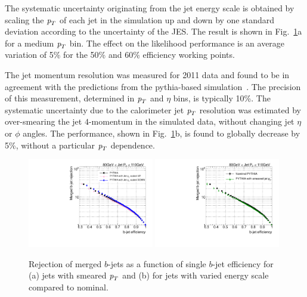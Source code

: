 The systematic uncertainty originating from the jet energy scale is obtained by scaling the ${\emph{p}_{T}}$ of each jet in the simulation up and down by one standard deviation according to the uncertainty of the JES.  The result is shown in Fig.~\ref{fig:jetresolution}a for a medium ${\emph{p}_{T}}$ bin. The effect on the likelihood performance is an average variation of 5\% for the 50\% and 60\% efficiency working points. 

The jet momentum resolution was measured for 2011 data and found to be in agreement with the predictions from the {\sc pythia}-based simulation~\cite{JER2011}. The precision of this measurement, determined in ${\emph{p}_{T}}$ and $\eta$ bins, is typically 10\%.
The systematic uncertainty due to the calorimeter jet ${\emph{p}_{T}}$ resolution was estimated by over-smearing the jet $4$-momentum in the simulated data, without changing jet $\eta$ or $\phi$ angles. The performance, shown in Fig.~\ref{fig:jetresolution}b, is found to globally decrease by  %
5\%, without a particular ${\emph{p}_{T}}$ dependence.


\begin{figure}[tp]
\centering
\includegraphics[width=0.49\textwidth]{FIGS/systematics/LlhoodKDE_ISO_JESUncertaintyTest_rejvseff080.pdf}
\includegraphics[width=0.49\textwidth]{FIGS/systematics/LlhoodKDE_ISO_SmearedJetPt_FIXEDBUGTest_rejvseff080.pdf}
\caption{Rejection of merged $b$-jets as a function of single $b$-jet efficiency for (a) jets with smeared ${\emph{p}_{T}}$ and (b) for jets with varied energy scale compared to nominal.}
\label{fig:jetresolution}
\end{figure}


